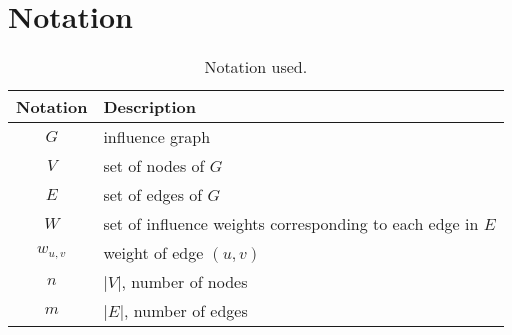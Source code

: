 \chapter{Notation}

\begin{table}[H]
\centering
\begin{tabular}{c l} \hline
\textbf{Notation}&\textbf{Description} \\ \hline
$G$&influence graph\\
$V$&set of nodes of $G$\\
$E$&set of edges of $G$\\
$W$&set of influence weights corresponding to each edge in $E$\\
$w_{u,v}$&weight of edge $(u,v)$\\
$n$&$|V|$, number of nodes\\
$m$&$|E|$, number of edges\\
\hline
\end{tabular}
\caption{Notation used.}
\label{tab:thesis_notation}
\end{table}